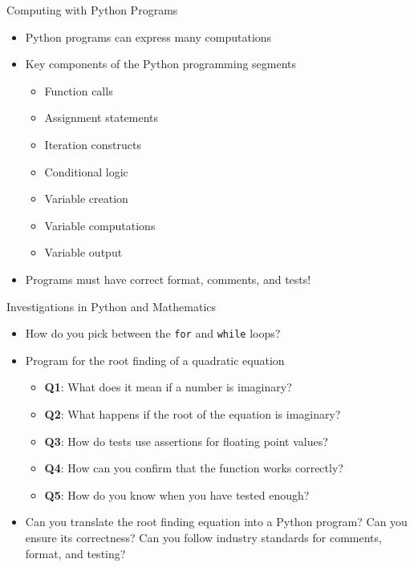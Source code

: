 \documentclass[14pt,aspectratio=169]{beamer}
\begin{document}
%
\begin{frame}{Computing with Python Programs}
  \begin{itemize}
    \item Python programs can express many computations
      \vspace*{-.15in}
    \item Key components of the Python programming segments
      \begin{itemize}
        \item Function calls
        \item Assignment statements
        \item Iteration constructs
        \item Conditional logic
        \item Variable creation
        \item Variable computations
        \item Variable output
      \end{itemize}
      \vspace*{-.2in}
    \item Programs must have correct format, comments, and tests!
  \end{itemize}
\end{frame}

%
\begin{frame}{Investigations in Python and Mathematics}
  \begin{itemize}
    \item How do you pick between the {\tt for} and {\tt while} loops?
      \vspace*{-.15in}
    \item Program for the root finding of a quadratic equation
      \begin{itemize}
        \item {\bf Q1}: What does it mean if a number is imaginary?
        \item {\bf Q2}: What happens if the root of the equation is imaginary?
        \item {\bf Q3}: How do tests use assertions for floating point values?
        \item {\bf Q4}: How can you confirm that the function works correctly?
        \item {\bf Q5}: How do you know when you have tested enough?
      \end{itemize}
      \vspace*{-.2in}
    \item Can you translate the root finding equation into a Python program?
      Can you ensure its correctness? Can you follow industry standards for
      comments, format, and testing?
  \end{itemize}
\end{frame}
\end{document}
